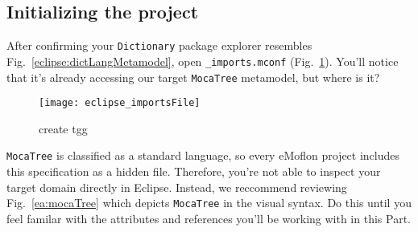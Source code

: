 \newpage
\hypertarget{initialize tex}{}
\subsection{Initializing the project}
\texHeader



After confirming your \texttt{Dictionary} package explorer resembles Fig.~\ref{eclipse:dictLangMetamodel}, open \texttt{\_imports.mconf}
(Fig.~\ref{eclipse:standardImports}). You'll notice that it's already accessing our target \texttt{MocaTree} metamodel, but where is it?

\begin{figure}[htbp]
\begin{center}
  \texttt{[image: eclipse\_importsFile]}
  \caption{create tgg}
  \label{eclipse:standardImports}
\end{center}
\end{figure}

\texttt{MocaTree} is classified as a standard language, so every eMoflon project includes this specification as a hidden file. Therefore, you're not able to
inspect your target domain directly in Eclipse. Instead, we reccommend reviewing Fig.~\ref{ea:mocaTree} which depicts \texttt{MocaTree} in the visual syntax. Do
this until you feel familar with the attributes and references you'll be working with in this Part.

